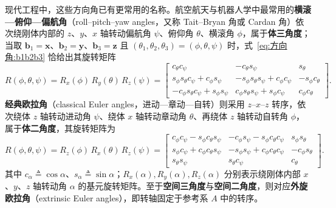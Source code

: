 现代工程中，这些方向角已有更常用的名称。航空航天与机器人学中最常用的\textbf{横滚—俯仰—偏航角}（roll--pitch--yaw angles，又称 Tait--Bryan 角或 Cardan 角）依次绕刚体内部的 $z$、$y$、$x$ 轴转动偏航角 $\psi$、俯仰角 $\theta$、横滚角 $\phi$，属于\textbf{体三角度}；当取 $\mathbf{b}_1=\mathbf{x}$、$\mathbf{b}_2=\mathbf{y}$、$\mathbf{b}_3=\mathbf{z}$ 且 $(\theta_1,\theta_2,\theta_3)=(\phi,\theta,\psi)$ 时，式~\eqref{eq:方向角:b1b2b3} 恰给出其旋转矩阵
$$
R(\phi,\theta,\psi)=R_x(\phi)\,R_y(\theta)\,R_z(\psi)
=\left[
\begin{array}{ccc}
c_\theta c_\psi & -c_\theta s_\psi & s_\theta\\
s_\phi s_\theta c_\psi+c_\phi s_\psi & -s_\phi s_\theta s_\psi+c_\phi c_\psi & -s_\phi c_\theta\\
-c_\phi s_\theta c_\psi+s_\phi s_\psi & c_\phi s_\theta s_\psi+s_\phi c_\psi & c_\phi c_\theta
\end{array}
\right].
$$
\textbf{经典欧拉角}（classical Euler angles，进动—章动—自转）则采用 $z$--$x$--$z$ 转序，依次绕体 $z$ 轴转动进动角 $\psi$、绕体 $x$ 轴转动章动角 $\theta$、再绕体 $z$ 轴转动自转角 $\phi$，属于\textbf{体二角度}，其旋转矩阵为
$$
R(\phi,\theta,\psi)=R_z(\phi)\,R_x(\theta)\,R_z(\psi)
=\left[
\begin{array}{ccc}
c_\phi c_\psi-s_\phi c_\theta s_\psi & -c_\phi s_\psi-s_\phi c_\theta c_\psi & s_\phi s_\theta\\
s_\phi c_\psi+c_\phi c_\theta s_\psi & -s_\phi s_\psi+c_\phi c_\theta c_\psi & -c_\phi s_\theta\\
s_\theta s_\psi & s_\theta c_\psi & c_\theta
\end{array}
\right].
$$
其中 $c_\alpha\triangleq\cos\alpha$、$s_\alpha\triangleq\sin\alpha$；$R_x(\alpha),R_y(\alpha),R_z(\alpha)$ 分别表示绕刚体内部 $x$、$y$、$z$ 轴转动角 $\alpha$ 的基元旋转矩阵。至于\textbf{空间三角度}与\textbf{空间二角度}，则对应\textbf{外旋欧拉角}（extrinsic Euler angles），即转轴固定于参考系 $A$ 中的转序。

